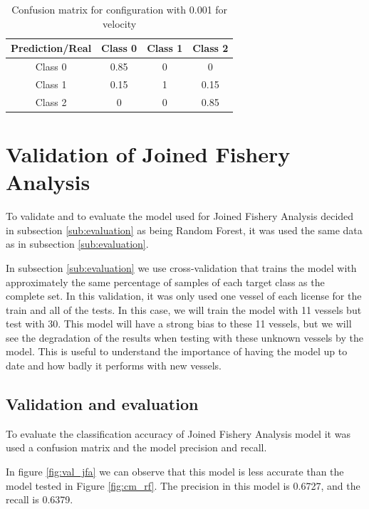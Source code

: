 \begin {table}[H]
\caption {Confusion matrix for configuration with 0.001 for velocity}
\begin{center}
\begin{tabular}{c|c|c|c}
Prediction/Real & \textbf{Class 0} & \textbf{Class 1} & \textbf{Class 2} \\\hline
Class 0 & 0.85 & 0 & 0 \\
Class 1 & 0.15 & 1 & 0.15 \\
Class 2 & 0 & 0 & 0.85 
\label{table:val_sfa_cm}
\end{tabular}
\end{center}
\end {table}



\section{Validation of Joined Fishery Analysis} %
\label{sub:val_JFA}

To validate and to evaluate the model used for Joined Fishery Analysis decided in subsection \ref{sub:evaluation} as being Random Forest, it was used the same data as in subsection \ref{sub:evaluation}.

In subsection \ref{sub:evaluation} we use cross-validation \cite{CrossValidatory} that trains the model with approximately the same percentage of samples of each target class as the complete set.
In this validation, it was only used one vessel of each license for the train and all of the tests. In this case, we will train the model with 11 vessels but test with 30. This model will have a strong bias to these 11 vessels, but we will see the degradation of the results when testing with these unknown vessels by the model.
This is useful to understand the importance of having the model up to date and how badly it performs with new vessels. 


\subsection{Validation and evaluation}
\label{sec:val_JFA_val_eva}
To evaluate the classification accuracy of Joined Fishery Analysis model it was used a confusion matrix and the model precision and recall.

In figure \ref{fig:val_jfa} we can observe that this model is less accurate than the model tested in Figure \ref{fig:cm_rf}. 
The precision in this model is 0.6727, and the recall is 0.6379.

